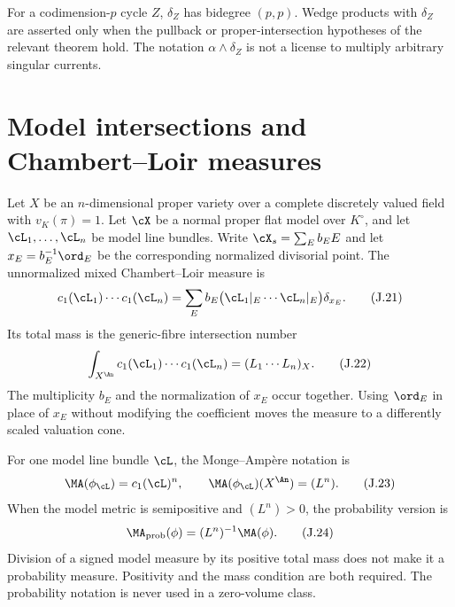 For a codimension-\(p\) cycle \(Z\), \(\delta_Z\) has bidegree \((p,p)\).
Wedge products with \(\delta_Z\) are asserted only when the pullback or
proper-intersection hypotheses of the relevant theorem hold.  The notation
\(\alpha\wedge\delta_Z\) is not a license to multiply arbitrary singular
currents.

\section{Model intersections and Chambert--Loir measures}
\label{sec:appJ-model-ma}

Let \(X\) be an \(n\)-dimensional proper variety over a complete
discretely valued field with \(v_K(\pi)=1\). Let \(\cX\) be a normal
proper flat model over \(K^\circ\), and let
\(\cL_1,\dots,\cL_n\) be model line bundles.  Write
\(\cX_s=\sum_E b_EE\) and let \(x_E=b_E^{-1}\ord_E\) be the corresponding
normalized divisorial point.  The unnormalized mixed Chambert--Loir measure is
\begin{equation*}
 c_1(\cL_1)\cdots c_1(\cL_n)
 =\sum_E b_E
  \bigl(\cL_1|_E\cdots\cL_n|_E\bigr)\delta_{x_E}.
 \tag{J.21}\label{eq:appJ-cl-measure}
\end{equation*}
Its total mass is the generic-fibre intersection number
\begin{equation*}
 \int_{X^{\An}}c_1(\cL_1)\cdots c_1(\cL_n)
 =(L_1\cdots L_n)_X.
 \tag{J.22}\label{eq:appJ-cl-total-mass}
\end{equation*}
The multiplicity \(b_E\) and the normalization of \(x_E\) occur together.
Using \(\ord_E\) in place of \(x_E\) without modifying the coefficient moves
the measure to a differently scaled valuation cone.

For one model line bundle \(\cL\), the Monge--Amp\`ere notation is
\begin{equation*}
 \MA(\phi_{\cL})=c_1(\cL)^n,
 \qquad
 \MA(\phi_{\cL})(X^{\An})=(L^n).
 \tag{J.23}\label{eq:appJ-model-ma}
\end{equation*}
When the model metric is semipositive and \((L^n)>0\), the probability
version is
\begin{equation*}
 \MA_{\mathrm{prob}}(\phi)
  =(L^n)^{-1}\MA(\phi).
 \tag{J.24}\label{eq:appJ-prob-ma}
\end{equation*}
Division of a signed model measure by its positive total mass does not
make it a probability measure. Positivity and the mass condition are both
required. The probability notation is never used in a zero-volume class.

